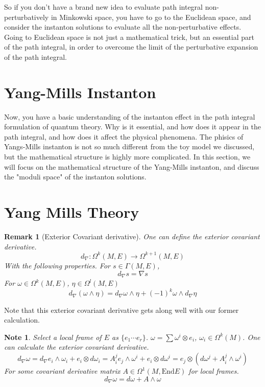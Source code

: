 \documentclass{article}
\newtheorem{rem}{Remark}
\newtheorem{note}{Note}
\begin{document}
So if you don't have a brand new idea to evaluate path integral non-perturbatively in Minkowski space, you have to go to the Euclidean space, and consider the instanton solutions to evaluate all the non-perturbative effects.
Going to Euclidean space is not just a mathematical trick, but an essential part of the path integral, in order to overcome the limit of the perturbative expansion of the path integral.
\section{Yang-Mills Instanton}
Now, you have a basic understanding of the instanton effect in the path integral formulation of quantum theory.
Why is it essential, and how does it appear in the path integral, and how does it affect the physical phenomena.
The phisics of Yangs-Mills instanton is not so much different from the toy model we discussed, but the mathematical structure is highly more complicated.
In this section, we will focus on the mathematical structure of the Yang-Mills instanton, and discuss the "moduli space" of the instanton solutions.

\section*{Yang Mills Theory}

\begin{rem}[Exterior Covariant derivative]
    One can define the exterior covariant derivative. 
    \[
        d_\nabla: \Omega^k(M,E)\rightarrow \Omega^{k+1}(M,E)
    \]
    With the following properties. For $s\in \Gamma(M,E)$,
    \[
        d_\nabla s = \nabla s 
    \]
    For $\omega\in \Omega^k(M,E)$, $\eta \in \Omega^l(M,E)$
    \[
        d_\nabla(\omega \wedge \eta ) = d_\nabla \omega \wedge \eta + (-1)^k \omega \wedge d_\nabla \eta
    \]
\end{rem}

Note that this exterior covariant derivative gets along well with our former calculation. 

\begin{note}
    Select a local frame of $E$ as $\{e_1\cdots e_r\}$. 
    $\omega = \sum \omega^i\otimes e_i$, $\omega_i \in \Omega^k(M)$. One can calculate the exterior covariant derivative.
    \[
        d_\nabla \omega = d_\nabla e_i \wedge \omega_i + e_i \otimes d\omega_i = A^j_i e_j \wedge \omega^i + e_i \otimes d\omega^i = e_j \otimes (d\omega^j + A^j_i \wedge \omega^i)
    \]
    For some covariant derivative matrix $A\in\Omega^1(M,\mathrm{End} E)$ for local frames. 
    \[
        d_\nabla \omega = d\omega + A\wedge \omega
    \]
\end{note}
\end{document}
